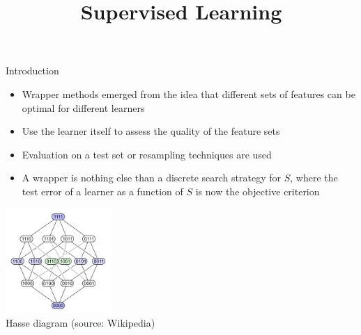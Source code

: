 \documentclass[11pt,compress,t,notes=noshow, xcolor=table]{beamer}
\title{Supervised Learning}
\date{}
\begin{document}

  \begin{vbframe}{Introduction}

    \begin{itemize}
      \item Wrapper methods emerged from the idea that different sets of features can be optimal for different learners
      \item Use the learner itself to assess the quality of the feature sets
      \item Evaluation on a test set or resampling techniques are used
      \item A wrapper is nothing else than a discrete search strategy for $S$, where the test error of a learner as a function of $S$ is now the objective criterion
    \end{itemize}

    \begin{center}
     \includegraphics[width = 0.3\textwidth]{figure/searchspace_binary.png}\\
     \scriptsize{Hasse diagram (source: Wikipedia)}
    \end{center}
    
\end{vbframe}
\end{document}
